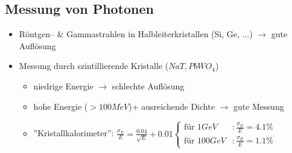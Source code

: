 \documentclass[Ex4_Zusammenfassung.tex]{subfiles}
\begin{document}


\subsection{Messung von Photonen}
\begin{itemize}
	\item Röntgen-- \& Gammastrahlen in Halbleiterkristallen (Si, Ge, ...) $\rightarrow$ gute Auflösung
	\item Messung durch szintillierende Kristalle ($NaT, PbWO_4$)
		\begin{itemize}
			\item niedrige Energie $\rightarrow$ schlechte Auflösung
			\item hohe Energie ($>100 \si{MeV}$)+ ausreichende Dichte $\rightarrow$ gute Messung
			\item ''Kristallkalorimeter'': $\frac{\sigma_E}{E} = \frac{0.04}{\sqrt{E}} + 0.01 
				\begin{cases}
					\text{für }1 \si{GeV}&: \frac{\sigma_E}{E}=4.1\% \\
					\text{für }100 \si{GeV} &: \frac{\sigma_E}{E} = 1.1\%
				\end{cases}$
		\end{itemize}
\end{itemize}
\end{document}
